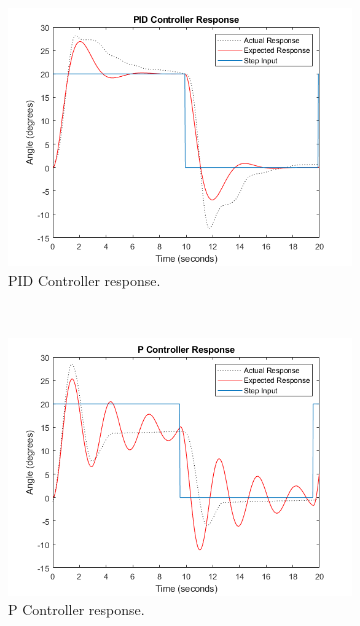 \documentclass[12pt]{article} %
\begin{document}
\begin{figure}[H]
	\centering
	\begin{subfigure}[b]{0.8\textwidth}
		\includegraphics[width=\textwidth]{pid-control}
		\caption{PID Controller response.}
		\label{fig:pid-control}
	\end{subfigure}
	\\[1em]
	\begin{subfigure}[b]{0.4\textwidth}
		\includegraphics[width=\textwidth]{p-control}
		\caption{P Controller response.}
		\label{fig:p-control}
	\end{subfigure}
	\begin{subfigure}[b]{0.4\textwidth}

\end{subfigure}
\end{figure}
\end{document}
